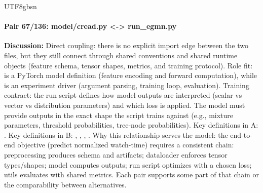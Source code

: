 \documentclass[11pt]{article}
\begin{document}
\begin{CJK*}{UTF8}{gbsn}
\paragraph{Pair 67/136: model/cread.py <-> run\_egmn.py}
\textbf{Discussion:} Direct coupling: there is no explicit import edge between the two files, but they still connect through shared conventions and shared runtime objects (feature schema, tensor shapes, metrics, and training protocol). Role fit: \texttt{} is a PyTorch model definition (feature encoding and forward computation), while \texttt{} is an experiment driver (argument parsing, training loop, evaluation). Training contract: the run script defines how model outputs are interpreted (scalar vs vector vs distribution parameters) and which loss is applied. The model must provide outputs in the exact shape the script trains against (e.g., mixture parameters, threshold probabilities, tree-node probabilities). Key definitions in A: \texttt{}. Key definitions in B: \texttt{}, \texttt{}, \texttt{}, \texttt{}. Why this relationship serves the model: the end-to-end objective (predict normalized watch-time) requires a consistent chain: preprocessing produces schema and artifacts; dataloader enforces tensor types/shapes; model computes outputs; run script optimizes with a chosen loss; utils evaluates with shared metrics. Each pair supports some part of that chain or the comparability between alternatives.


\end{CJK*}
\end{document}
